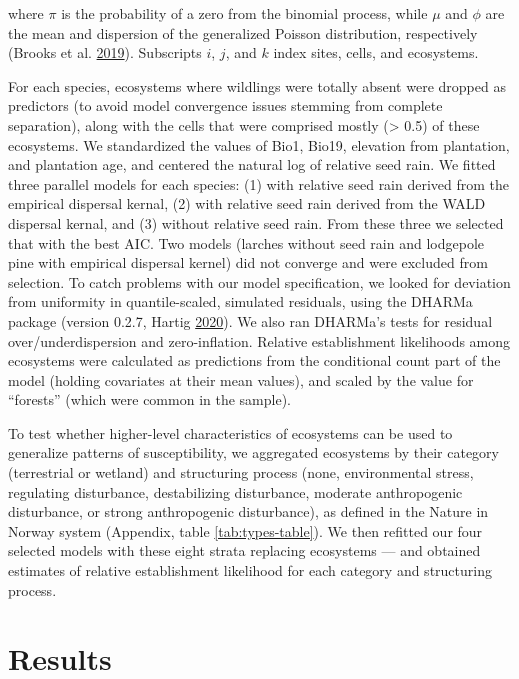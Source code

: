 \documentclass[
]{article}
\begin{document}
where \(\pi\) is the probability of a zero from the binomial process, while \(\mu\) and \(\phi\) are the mean and dispersion of the generalized Poisson distribution, respectively (Brooks et al. \protect\hyperlink{ref-brooksStatisticalModelingPatterns2019}{2019}).
Subscripts \(i\), \(j\), and \(k\) index sites, cells, and ecosystems.

For each species, ecosystems where wildlings were totally absent were dropped as predictors (to avoid model convergence issues stemming from complete separation), along with the cells that were comprised mostly (\textgreater{} 0.5) of these ecosystems.
We standardized the values of Bio1, Bio19, elevation from plantation, and plantation age, and centered the natural log of relative seed rain.
We fitted three parallel models for each species: (1) with relative seed rain derived from the empirical dispersal kernal, (2) with relative seed rain derived from the WALD dispersal kernal, and (3) without relative seed rain.
From these three we selected that with the best AIC.
Two models (larches without seed rain and lodgepole pine with empirical dispersal kernel) did not converge and were excluded from selection.
To catch problems with our model specification, we looked for deviation from uniformity in quantile-scaled, simulated residuals, using the DHARMa package (version 0.2.7, Hartig \protect\hyperlink{ref-hartigDHARMaResidualDiagnostics2020}{2020}).
We also ran DHARMa's tests for residual over/underdispersion and zero-inflation.
Relative establishment likelihoods among ecosystems were calculated as predictions from the conditional count part of the model (holding covariates at their mean values), and scaled by the value for ``forests'' (which were common in the sample).

To test whether higher-level characteristics of ecosystems can be used to generalize patterns of susceptibility, we aggregated ecosystems by their category (terrestrial or wetland) and structuring process (none, environmental stress, regulating disturbance, destabilizing disturbance, moderate anthropogenic disturbance, or strong anthropogenic disturbance), as defined in the Nature in Norway system (Appendix, table \ref{tab:types-table}).
We then refitted our four selected models with these eight strata replacing ecosystems --- and obtained estimates of relative establishment likelihood for each category and structuring process.

\hypertarget{results}{%
\section{Results}\label{results}}
\end{document}
